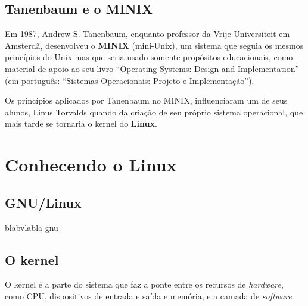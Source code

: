 \documentclass{handout_utfpr}
\begin{document}
\subsection{Tanenbaum e o MINIX}
Em 1987, Andrew S. Tanenbaum, enquanto professor da Vrije Universiteit em Amsterdã, desenvolveu o \textbf{MINIX} (mini-Unix), um sistema que seguia os mesmos princípios do Unix mas que seria usado somente propósitos educacionais, como material de apoio ao seu livro ``Operating Systems: Design and Implementation'' (em português: ``Sistemas Operacionais: Projeto e Implementação'').

Os princípios aplicados por Tanenbaum no MINIX, influenciaram um de seus alunos, Linus Torvalds quando da criação de seu próprio sistema operacional, que mais tarde se tornaria o kernel do \textbf{Linux}.






\section{Conhecendo o Linux}

\subsection{GNU/Linux}
blabvlabla gnu

\subsection{O kernel}
O kernel é a parte do sistema que faz a ponte entre os recursos de \textit{hardware}, como CPU, dispositivos de entrada e saída e memória; e a camada de \textit{software}.
\end{document}
